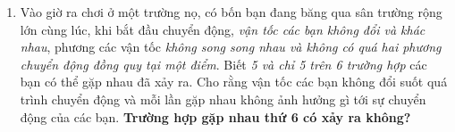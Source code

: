 \begin{enumerate}
    \item Vào giờ ra chơi ở một trường nọ, có bốn bạn đang băng qua sân trường rộng lớn cùng lúc, khi bắt đầu chuyển động, \textit{vận tốc các bạn không đổi và khác nhau}, phương các vận tốc \textit{không song song nhau và không có quá hai phương chuyển động đồng quy tại một điểm}. Biết \textit{5 và chỉ 5 trên 6 trường hợp} các bạn có thể gặp nhau đã xảy ra. Cho rằng vận tốc các bạn không đổi suốt quá trình chuyển động và mỗi lần gặp nhau không ảnh hưởng gì tới sự chuyển động của các bạn. \textbf{Trường hợp gặp nhau thứ 6 có xảy ra không?}  
\begin{figure}[ht]
    \centering
\end{figure}
\end{enumerate}
